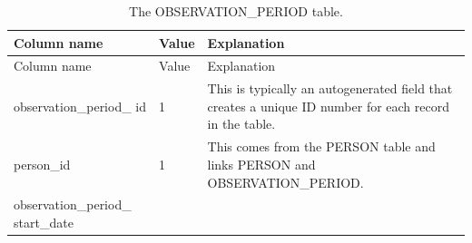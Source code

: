 \documentclass[11pt]{book}
\begin{document}
\begin{longtable}[]{@{}lll@{}}
\caption{\label{tab:observationPeriod} The OBSERVATION\_PERIOD
table.}\tabularnewline
\toprule
\begin{minipage}[b]{0.28\columnwidth}\raggedright\strut
Column name\strut
\end{minipage} & \begin{minipage}[b]{0.16\columnwidth}\raggedright\strut
Value\strut
\end{minipage} & \begin{minipage}[b]{0.48\columnwidth}\raggedright\strut
Explanation\strut
\end{minipage}\tabularnewline
\midrule
\endfirsthead
\toprule
\begin{minipage}[b]{0.28\columnwidth}\raggedright\strut
Column name\strut
\end{minipage} & \begin{minipage}[b]{0.16\columnwidth}\raggedright\strut
Value\strut
\end{minipage} & \begin{minipage}[b]{0.48\columnwidth}\raggedright\strut
Explanation\strut
\end{minipage}\tabularnewline
\midrule
\endhead
\begin{minipage}[t]{0.28\columnwidth}\raggedright\strut
observation\_period\_ id\strut
\end{minipage} & \begin{minipage}[t]{0.16\columnwidth}\raggedright\strut
1\strut
\end{minipage} & \begin{minipage}[t]{0.48\columnwidth}\raggedright\strut
This is typically an autogenerated field that creates a unique ID number
for each record in the table.\strut
\end{minipage}\tabularnewline
\begin{minipage}[t]{0.28\columnwidth}\raggedright\strut
person\_id\strut
\end{minipage} & \begin{minipage}[t]{0.16\columnwidth}\raggedright\strut
1\strut
\end{minipage} & \begin{minipage}[t]{0.48\columnwidth}\raggedright\strut
This comes from the PERSON table and links PERSON and
OBSERVATION\_PERIOD.\strut
\end{minipage}\tabularnewline
\begin{minipage}[t]{0.28\columnwidth}\raggedright\strut
observation\_period\_ start\_date\strut
\end{minipage} & \begin{minipage}[t]{0.16\columnwidth}\raggedright\strut

\end{minipage}
\end{longtable}
\end{document}
